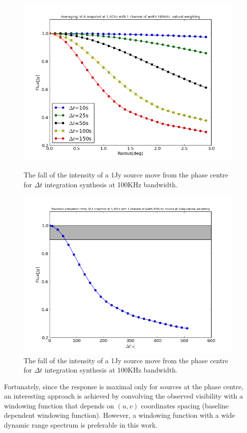 \documentclass[useAMS,usenatbib]{mn2e}
\begin{document}
\begin{figure}
\begin{minipage}{0.38\linewidth}\includegraphics[width=1\textwidth]{./Figures/effect_time_averaging.png}\caption{The fall of the 
intensity of a 1Jy source move from the phase centre for $\Delta t$ integration synthesis at 100KHz 
bandwidth.}\label{timessear2}\end{minipage}
\begin{minipage}{0.38\linewidth}\includegraphics[width=1\textwidth]{./Figures/maximun_integration.png}\caption{The fall of the 
intensity of a 1Jy source move from the phase centre for $\Delta t$ integration synthesis at 100KHz 
bandwidth.}\label{fig:fig_5}\end{minipage}
\end{figure}
Fortunately, since the response is maximal only for sources at the phase centre, an interesting approach is achieved by convolving the 
observed visibility with a  windowing function that depends on $(u,v)$ coordinates spacing (baseline dependent windowing function). 
However, a windowing function with a wide dynamic range spectrum is preferable in this work.
\end{document}
